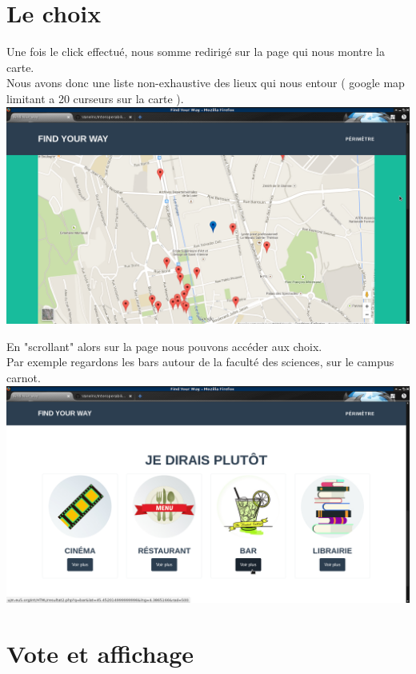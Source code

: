 \documentclass[10pt,a4paper, landscape]{report}
\begin{document}
\newpage
\section{Le choix}

Une fois le click effectué, nous somme redirigé sur la page qui nous montre la carte. \\
Nous avons donc une liste non-exhaustive des lieux qui nous entour ( google map limitant a 20 curseurs sur la carte ). \\
\includegraphics[scale=0.5]{images/map.png} 

\newpage
En "scrollant" alors sur la page nous pouvons accéder aux choix. \\
Par exemple regardons les bars autour de la faculté des sciences, sur le campus carnot. \\
\includegraphics[scale=0.5]{images/choix.png} 

\newpage
\section{Vote et affichage}
\end{document}
